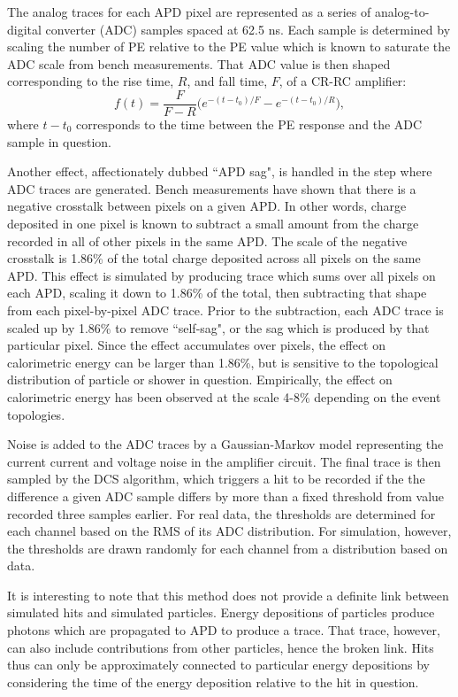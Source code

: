 The analog traces for each APD pixel are represented as a series of analog-to-digital converter (ADC) samples spaced at 62.5 ns.  Each sample is determined by scaling the number of PE relative to the PE value which is known to saturate the ADC scale from bench measurements.  That ADC value is then shaped corresponding to the rise time, $R$, and fall time, $F$, of a CR-RC amplifier:
\begin{equation}
f(t) = \frac{F}{F − R}\bigg (e^{-(t-t_0)/F} - e^{-(t-t_0)/R}\bigg ),
\end{equation}
where $t-t_0$ corresponds to the time between the PE response and the ADC sample in question.

Another effect, affectionately dubbed ``APD sag", is handled in the step where ADC traces are generated.  Bench measurements have shown that there is a negative crosstalk between pixels on a given APD.  In other words, charge deposited in one pixel is known to subtract a small amount from the charge recorded in all of other pixels in the same APD.  The scale of the negative crosstalk is 1.86\% of the total charge deposited across all pixels on the same APD.  This effect is simulated by producing trace which sums over all pixels on each APD, scaling it down to 1.86\% of the total, then subtracting that shape from each pixel-by-pixel ADC trace.  Prior to the subtraction, each ADC trace is scaled up by 1.86\% to remove ``self-sag", or the sag which is produced by that particular pixel.  Since the effect accumulates over pixels, the effect on calorimetric energy can be larger than 1.86\%, but is sensitive to the topological distribution of particle or shower in question.  Empirically, the effect on calorimetric energy has been observed at the scale 4-8\% depending on the event topologies.

Noise is added to the ADC traces by a Gaussian-Markov model representing the current current and voltage noise in the amplifier circuit.  The final trace is then sampled by the DCS algorithm, which triggers a hit to be recorded if the the difference a given ADC sample differs by more than a fixed threshold from value recorded three samples earlier.  For real data, the thresholds are determined for each channel based on the RMS of its ADC distribution.  For simulation, however, the thresholds are drawn randomly for each channel from a distribution based on data.

It is interesting to note that this method does not provide a definite link between simulated hits and simulated particles.  Energy depositions of particles produce photons which are propagated to APD to produce a trace.  That trace, however, can also include contributions from other particles, hence the broken link.  Hits thus can only be approximately connected to particular energy depositions by considering the time of the energy deposition relative to the hit in question.

